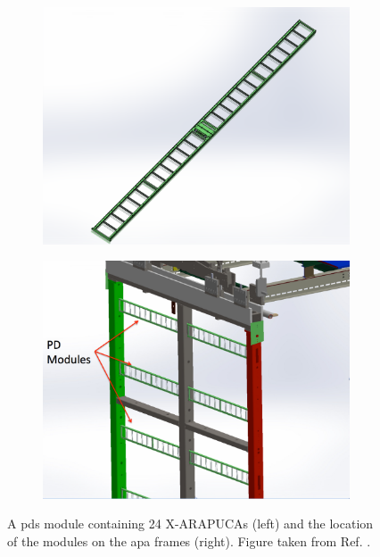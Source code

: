 \begin{figure}[t]
	\begin{subfigure}{0.49\textwidth}
		\centering
		\includegraphics[width=.90\linewidth]{Images/DUNE/FD/pds-module}
	\end{subfigure}
	\begin{subfigure}{0.49\textwidth}
		\centering
		\includegraphics[width=.90\linewidth]{Images/DUNE/FD/pds-in-apa-assembly}
	\end{subfigure}
	\caption[A \gls{pds} module containing 24 X-ARAPUCAs and the location of the modules on the \gls{apa} frames.]{A \gls{pds} module containing 24 X-ARAPUCAs (left) and the location of the modules on the \gls{apa} frames (right). Figure taken from Ref. \cite{DUNE2020TDR1}.}
	\label{fig:dune_pds}
\end{figure}

